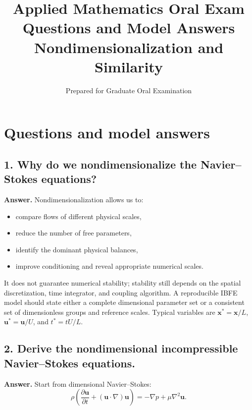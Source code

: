 \documentclass[12pt]{article}
\title{\vspace{-2em}\textbf{Applied Mathematics Oral Exam Questions and Model Answers}\\
\large Nondimensionalization and Similarity}
\author{Prepared for Graduate Oral Examination}
\date{}
\begin{document}
\maketitle

\section*{Questions and model answers}

\subsection*{1. Why do we nondimensionalize the Navier--Stokes equations?}

\textbf{Answer.}
Nondimensionalization allows us to:
\begin{itemize}
    \item compare flows of different physical scales,
    \item reduce the number of free parameters,
    \item identify the dominant physical balances,
    \item improve conditioning and reveal appropriate numerical scales.
\end{itemize}
It does not guarantee numerical stability; stability still depends on the
spatial discretization, time integrator, and coupling algorithm. A reproducible
IBFE model should state either a complete dimensional parameter set or a
consistent set of dimensionless groups and reference scales. Typical variables
are $\mathbf{x}^*=\mathbf{x}/L$, $\mathbf{u}^*=\mathbf{u}/U$, and $t^*=tU/L$.


\subsection*{2. Derive the nondimensional incompressible Navier--Stokes equations.}

\textbf{Answer.}
Start from dimensional Navier--Stokes:
\[
\rho\left(
\frac{\partial \mathbf{u}}{\partial t} + (\mathbf{u}\cdot\nabla)\mathbf{u}
\right)
= -\nabla p + \mu\nabla^2\mathbf{u}.
\]
\end{document}
